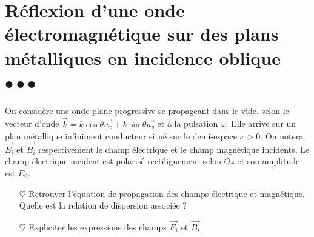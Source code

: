 \documentclass{report}
\begin{document}
\newpage

\section*{Réflexion d'une onde électromagnétique sur des plans métalliques en incidence oblique $\bullet\bullet\bullet$}

On considère une onde plane progressive se propageant dans le vide, selon le vecteur d'onde $\vec{k}=k\cos\theta\vec{u_x}+k\sin\theta\vec{u_y}$ et à la pulsation $\omega$. Elle arrive sur un plan métallique infiniment conducteur situé sur le demi-espace $x>0$. On notera $\vec{E_i}$ et $\vec{B_i}$ respectivement le champ électrique et le champ magnétique incidents. Le champ électrique incident est polarisé rectilignement selon $Oz$ et son amplitude est $E_0$.

\begin{itemize}
		
	\item[$\heartsuit$]	Retrouver l'équation de propagation des champs électrique et magnétique. Quelle est la relation de dispersion associée ? 
	
	\item[$\heartsuit$] Expliciter les expressions des champs $\vec{E_i}$ et $\vec{B_i}$.
	
\end{itemize}
\end{document}
